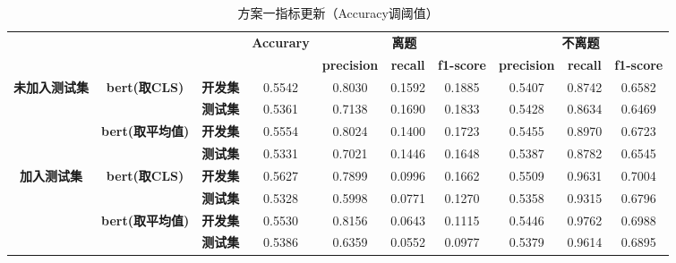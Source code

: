 \documentclass[11pt]{article}
\begin{document}
\begin{CJK}{UTF8}{gkai}
\begin{table}[htbp]\small
  \centering
    \begin{tabular}{c|cc|c|ccc|ccc}
      \hline
      \multicolumn{3}{c}{\multirow{2}[0]{*}{\textcolor[rgb]{ 1,  0,  0}{}}} & \multirow{2}[0]{*}{\textbf{Accurary}} & \multicolumn{3}{c}{\textbf{离题}} & \multicolumn{3}{c}{\textbf{不离题}} \\
      \multicolumn{3}{c}{}  &       & \textbf{precision} & \textbf{recall} & \textbf{f1-score} & \textbf{precision} & \textbf{recall} & \textbf{f1-score} \\
      \hline
      \multirow{4}[0]{*}{\textbf{未加入测试集}} & \multirow{2}[0]{*}{\textbf{bert(取CLS)}} & \textbf{开发集} & 0.5542  & 0.8030  & 0.1592  & 0.1885  & 0.5407  & 0.8742  & 0.6582  \\
      &       & \textbf{测试集} & 0.5361  & 0.7138  & 0.1690  & 0.1833  & 0.5428  & 0.8634  & 0.6469  \\
      \cline{2-10}
      & \multirow{2}[0]{*}{\textbf{bert(取平均值)}} & \textbf{开发集} & 0.5554  & 0.8024  & 0.1400  & 0.1723  & 0.5455  & 0.8970  & 0.6723  \\
      &       & \textbf{测试集} & 0.5331  & 0.7021  & 0.1446  & 0.1648  & 0.5387  & 0.8782  & 0.6545  \\
      \hline
      \multirow{4}[0]{*}{\textbf{加入测试集}} & \multirow{2}[0]{*}{\textbf{bert(取CLS)}} & \textbf{开发集} & 0.5627  & 0.7899  & 0.0996  & 0.1662  & 0.5509  & 0.9631  & 0.7004  \\
      &       & \textbf{测试集} & 0.5328  & 0.5998  & 0.0771  & 0.1270  & 0.5358  & 0.9315  & 0.6796  \\
      \cline{2-10}
      & \multirow{2}[0]{*}{\textbf{bert(取平均值)}} & \textbf{开发集} & 0.5530  & 0.8156  & 0.0643  & 0.1115  & 0.5446  & 0.9762  & 0.6988  \\
      &       & \textbf{测试集} & 0.5386  & 0.6359  & 0.0552  & 0.0977  & 0.5379  & 0.9614  & 0.6895  \\
      \hline
    \end{tabular}%
    \caption{方案一指标更新（Accuracy调阈值）}
  \label{tab:addlabel}%
\end{table}%


\end{CJK}
\end{document}
